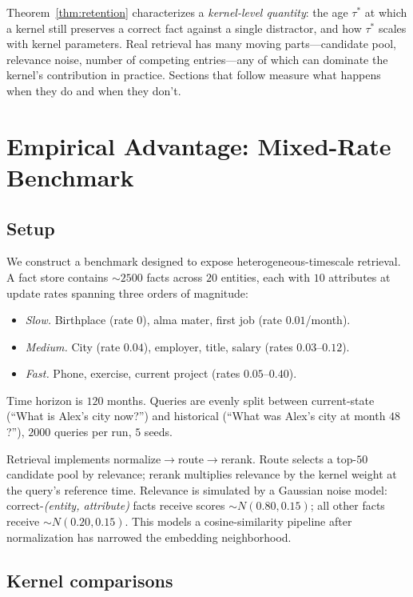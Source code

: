 \documentclass[11pt]{article}
\theoremstyle{plain}
\theoremstyle{definition}
\begin{document}
Theorem~\ref{thm:retention} characterizes a
\emph{kernel-level quantity}: the age $\tau^*$ at
which a kernel still preserves a correct fact against
a single distractor, and how $\tau^*$ scales with
kernel parameters.  Real retrieval has many moving
parts---candidate pool, relevance noise, number of
competing entries---any of which can dominate the
kernel's contribution in practice.  Sections that
follow measure what happens when they do and when
they don't.

\section{Empirical Advantage: Mixed-Rate
Benchmark}\label{sec:empirical}

\subsection{Setup}

We construct a benchmark designed to expose
heterogeneous-timescale retrieval.  A fact store
contains $\sim\!2500$ facts across $20$ entities, each
with $10$ attributes at update rates spanning three
orders of magnitude:

\begin{itemize}[leftmargin=*]
\item \emph{Slow.}  Birthplace (rate $0$), alma mater,
  first job (rate $0.01$/month).
\item \emph{Medium.}  City (rate $0.04$), employer,
  title, salary (rates $0.03$--$0.12$).
\item \emph{Fast.}  Phone, exercise, current project
  (rates $0.05$--$0.40$).
\end{itemize}

Time horizon is $120$ months.  Queries are
evenly split between current-state (``What is Alex's
city now?'') and historical (``What was Alex's city
at month $48$?''), $2000$ queries per run, $5$ seeds.

Retrieval implements normalize$\to$route$\to$rerank.
Route selects a top-$50$ candidate pool by relevance;
rerank multiplies relevance by the kernel weight at
the query's reference time.  Relevance is simulated
by a Gaussian noise model: correct-\emph{(entity,
attribute)} facts receive scores $\sim\!N(0.80, 0.15)$;
all other facts receive $\sim\!N(0.20, 0.15)$.  This
models a cosine-similarity pipeline after
normalization has narrowed the embedding neighborhood.


\subsection{Kernel comparisons}
\end{document}
